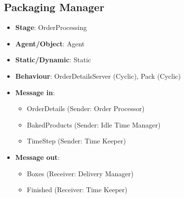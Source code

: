 \documentclass[12pt]{article}
\begin{document}
\subsection{Packaging Manager}%
\label{sub:packaging_manager}
\begin{itemize}
    \item \textbf{Stage}: OrderProcessing
    \item \textbf{Agent/Object}: Agent
    \item \textbf{Static/Dynamic}: Static
    \item \textbf{Behaviour}: OrderDetailsServer (Cyclic), Pack (Cyclic)
    \item \textbf{Message in}:
        \begin{itemize}
            \item OrderDetails (Sender: Order Processor)
            \item BakedProducts (Sender: Idle Time Manager)
            \item TimeStep (Sender: Time Keeper)
        \end{itemize}
    \item \textbf{Message out}:
        \begin{itemize}
            \item Boxes (Receiver: Delivery Manager)
            \item Finished (Receiver: Time Keeper)
        \end{itemize}
\end{itemize}
\end{document}
